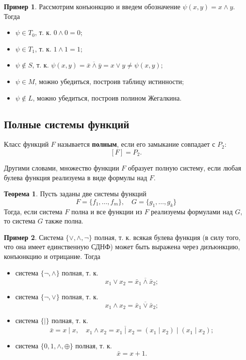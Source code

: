 \documentclass[a5paper, 11pt]{extarticle}
\theoremstyle{definition}
\newtheorem*{theorem*}{Теорема}
\newtheorem*{example*}{Пример}
\theoremstyle{definition}
\theoremstyle{definition}
\numberwithin{figure}{section}
\numberwithin{table}{section}
\begin{document}
\begin{example*}
    Рассмотрим конъюнкцию и введем обозначение \(\psi(x, y) = x \land y\). Тогда
    \begin{itemize}
        \item \(\psi \in T_0\), т. к. \(0 \land 0 = 0\);
        \item \(\psi \in T_1\), т. к. \(1 \land 1 = 1\);
        \item \(\psi \notin S\), т. к. \(\psi(x, y) = \overline{\bar{x} \land \bar{y}} = x \lor y \neq \psi(x, y)\);
        \item \(\psi \in M\), можно убедиться, построив таблицу истинности;
        \item \(\psi \notin L\), можно убедиться, построив полином Жегалкина.
    \end{itemize}
\end{example*}

\subsection{Полные системы функций}

Класс функций \(F\) называется \textbf{полным}, если его замыкание совпадает с \(P_2\):
\[
    [F] = P_2.
\]

Другими словами, множество функции \(F\) образует полную систему, если любая булева функция реализуема в виде формулы над \(F\).

\begin{theorem*}
    Пусть заданы две системы функций
    \[
        F = \{f_1, \ldots, f_m\},
        \quad
        G = \{g_1, \ldots, g_k\}
    \]
    Тогда, если система \(F\) полна и все функции из \(F\) реализуемы формулами над \(G\), то система \(G\) также полна.
\end{theorem*}

\begin{example*}
    Система \(\{\lor, \land, \neg\}\) полная, т. к. всякая булева функция (в силу того, что она имеет единственную СДНФ) может быть выражена через дизъюнкцию, конъюнкцию и отрицание. Тогда
    \begin{itemize}
        \item система \(\{\neg, \land\}\) полная, т. к.
              \[
                  x_1 \lor x_2 = \overline{\bar{x}_1 \land \bar{x}_2};
              \]
        \item система \(\{\neg, \lor\}\) полная, т. к.
              \[
                  x_1 \land x_2 = \overline{\bar{x}_1 \lor \bar{x}_2};
              \]
        \item система \(\{\mid\}\) полная, т. к.
              \[
                  \bar{x} = x \mid x,
                  \quad
                  x_1 \land x_2 = \overline{x_1 \mid x_2} = (x_1 \mid x_2) \mid (x_1 \mid x_2);
              \]
        \item система \(\{0, 1, \land, \oplus\}\) полная, т. к.
              \[
                  \bar{x} = x \plus 1.
              \]
    \end{itemize}
\end{example*}
\end{document}
